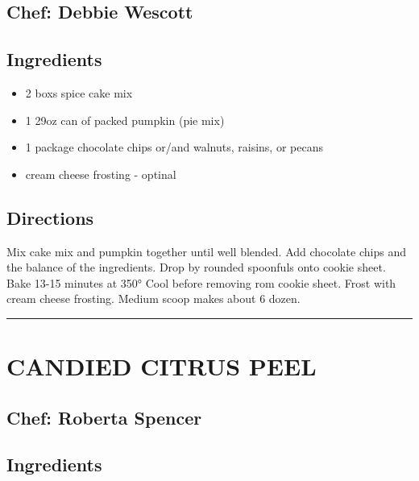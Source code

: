\documentclass[
]{book}
\providecommand{\tightlist}{%
  \setlength{\itemsep}{0pt}\setlength{\parskip}{0pt}}
\begin{document}
\hypertarget{chef-debbie-wescott-6}{%
\subsection*{Chef: Debbie Wescott}\label{chef-debbie-wescott-6}}


\hypertarget{ingredients-96}{%
\subsection*{Ingredients}\label{ingredients-96}}


\begin{itemize}
\tightlist
\item
  2 boxs spice cake mix
\item
  1 29oz can of packed pumpkin (pie mix)
\item
  1 package chocolate chips or/and walnuts, raisins, or pecans
\item
  cream cheese frosting - optinal
\end{itemize}

\hypertarget{directions-96}{%
\subsection*{Directions}\label{directions-96}}


Mix cake mix and pumpkin together until well blended. Add chocolate chips and the balance of the ingredients. Drop by rounded spoonfuls onto cookie sheet. Bake 13-15 minutes at 350° Cool before removing rom cookie sheet. Frost with cream cheese frosting. Medium scoop makes about 6 dozen.

\begin{center}\rule{0.5\linewidth}{0.5pt}\end{center}

\hypertarget{candied-citrus-peel}{%
\section*{CANDIED CITRUS PEEL}\label{candied-citrus-peel}}


\hypertarget{chef-roberta-spencer-33}{%
\subsection*{Chef: Roberta Spencer}\label{chef-roberta-spencer-33}}


\hypertarget{ingredients-97}{%
\subsection*{Ingredients}\label{ingredients-97}}
\end{document}
